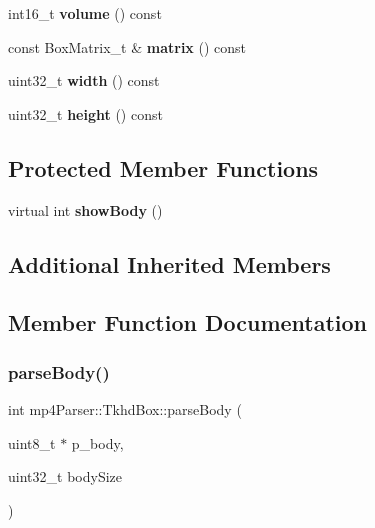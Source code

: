 \begin{DoxyCompactItemize}
int16\+\_\+t {\bfseries volume} () const
\item 
\mbox{\label{classmp4_parser_1_1_tkhd_box_a7989cc25d16f25c1113318962e21ea1e}} 
const Box\+Matrix\+\_\+t \& {\bfseries matrix} () const
\item 
\mbox{\label{classmp4_parser_1_1_tkhd_box_aed6f3f2dcf791e528a70c68844938c98}} 
uint32\+\_\+t {\bfseries width} () const
\item 
\mbox{\label{classmp4_parser_1_1_tkhd_box_a97bacd196e9a329ea06b16a2170a6377}} 
uint32\+\_\+t {\bfseries height} () const
\end{DoxyCompactItemize}
\subsection*{Protected Member Functions}
\begin{DoxyCompactItemize}
\item 
\mbox{\label{classmp4_parser_1_1_tkhd_box_ad08a80721547739985a62e71d00e50bc}} 
virtual int {\bfseries show\+Body} ()
\end{DoxyCompactItemize}
\subsection*{Additional Inherited Members}


\subsection{Member Function Documentation}
\mbox{\label{classmp4_parser_1_1_tkhd_box_ac70fee1e0bf78ef17d799a11be040b38}} 
\subsubsection{\texorpdfstring{parseBody()}{parseBody()}}
{\footnotesize\ttfamily int mp4\+Parser\+::\+Tkhd\+Box\+::parse\+Body (\begin{DoxyParamCaption}\item[{uint8\+\_\+t $\ast$}]{p\+\_\+body,  }\item[{uint32\+\_\+t}]{body\+Size }\end{DoxyParamCaption})\hspace{0.3cm}{\ttfamily [virtual]}}



